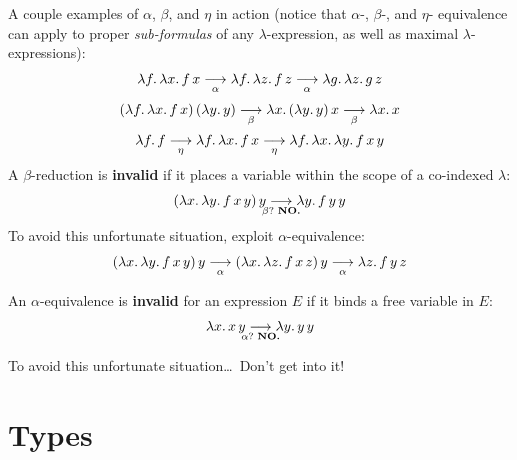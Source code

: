 \documentclass{article}
\begin{document}
A couple examples of $\alpha$, $\beta$, and $\eta$ in action (notice that
$\alpha$-, $\beta$-, and $\eta$- equivalence can apply to proper
\emph{sub-formulas} of any $\lambda$-expression, as well as maximal
$\lambda$-expressions):
\begin{align}
  \begin{array}{c}
    \notag
    \lambda f.\,\lambda x.\, f\,x \underset{\alpha}{\longrightarrow} \lambda
    f.\,\lambda z.\,f\,z \underset{\alpha}{\longrightarrow} \lambda g.\, \lambda
    z.\, g\,z
    \\[1em]
    (\lambda f.\, \lambda x.\, f\,x)\,(\lambda y.\, y)
    \underset{\beta}{\longrightarrow} \lambda x.\, (\lambda y.\,y)\,x
    \underset{\beta}{\longrightarrow} \lambda x.\, x
    \\[1em] 
    \lambda f.\, f \underset{\eta}{\longrightarrow} \lambda f.\, \lambda x.\,
    f\, x \underset{\eta}{\longrightarrow} \lambda f.\, \lambda x.\, \lambda
    y.\, f\, x\, y
  \end{array}
\end{align}
%
A $\beta$-reduction is \textbf{invalid} if it places a variable within the scope
of a co-indexed $\lambda$:
\begin{align}
  \notag
  (\lambda x.\, \lambda y.\, f\,x\,y)\,y
  \underset{\mathclap{\beta\text{?~}\textbf{NO.}}}{\longrightarrow}
  \lambda y.\, f\, y\, y
\end{align}
%
To avoid this unfortunate situation, exploit $\alpha$-equivalence:
\begin{align}
  \notag
  (\lambda x.\, \lambda y.\, f\,x\,y)\,y
  \underset{\alpha}{\longrightarrow}
  (\lambda x.\, \lambda z.\, f\,x\,z)\,y
  \underset{\alpha}{\longrightarrow}
  \lambda z.\, f\, y\, z
\end{align}

An $\alpha$-equivalence is \textbf{invalid} for an expression $E$ if it binds a
free variable in $E$:
\begin{align}
  \notag
  \lambda x.\,x\,y
  \underset{\mathclap{\alpha\text{?~}\textbf{NO.}}}{\longrightarrow}
  \lambda y.\,y\, y
\end{align}

To avoid this unfortunate situation\dots\ Don't get into it!

\section{Types}
\end{document}
